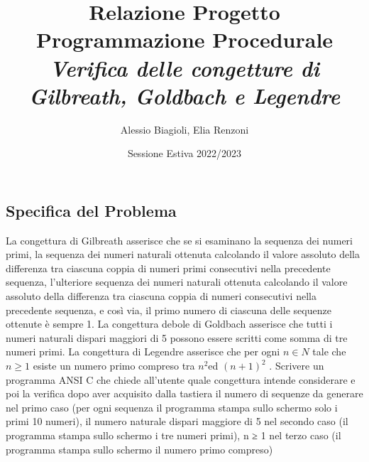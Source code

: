 \documentclass{article}
\title{\bfseries Relazione Progetto Programmazione Procedurale \\\itshape Verifica delle congetture di Gilbreath, Goldbach e Legendre }
\author{Alessio Biagioli, Elia Renzoni}
\date{Sessione Estiva 2022/2023}
\begin{document}
\maketitle
\newpage

\begin{center}
\section{Specifica del Problema}
\end{center}


\large
La congettura di Gilbreath asserisce che se si esaminano la sequenza dei numeri primi, la sequenza dei numeri naturali ottenuta calcolando il valore assoluto della differenza tra ciascuna coppia di numeri primi consecutivi nella precedente sequenza, l’ulteriore sequenza dei numeri naturali ottenuta calcolando il valore assoluto della differenza tra ciascuna coppia di numeri consecutivi nella precedente sequenza, e così via, il primo numero di ciascuna delle sequenze ottenute è sempre 1. La congettura debole di Goldbach asserisce che tutti i numeri naturali dispari maggiori di 5 possono essere scritti come somma di tre numeri primi. La congettura di Legendre asserisce che per ogni \begin{math}
    
n \in N \end{math} tale che \begin{math}  n \geq 1 \end{math} esiste un numero primo compreso tra \begin{math} n^2 \end{math}ed \begin{math}(n + 1)^2 \end{math} . Scrivere un programma ANSI C che chiede all’utente quale congettura intende considerare e poi la verifica dopo aver acquisito dalla tastiera il numero di sequenze da generare nel primo caso (per ogni sequenza il programma stampa sullo schermo solo i primi 10 numeri), il numero naturale dispari maggiore di 5 nel secondo caso (il programma stampa sullo schermo i tre numeri primi), n ≥ 1 nel terzo caso (il programma stampa sullo schermo il numero primo compreso)

\end{document}
